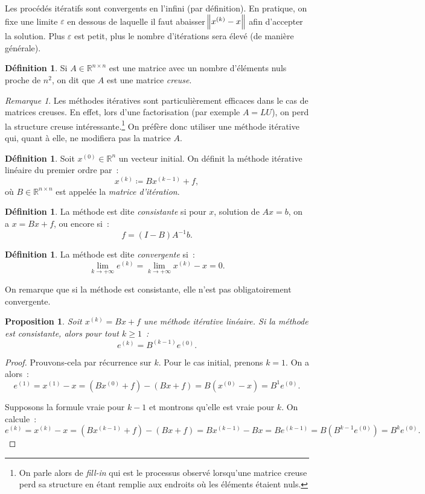 \documentclass{article}
\newtheorem{prp}[thm]{Proposition}
\theoremstyle{definition}
\newtheorem{déf}[thm]{Définition}
\theoremstyle{remark}
\newtheorem*{rmq}{Remarque}
\newcommand{\R}{\mathbb R}
\begin{document}
		Les procédés itératifs sont convergents en l'infini (par définition). En pratique, on fixe une limite $\varepsilon$ en dessous de laquelle il faut
		abaisser $\norm{x^{(k)}-x}$ afin d'accepter la solution. Plus $\varepsilon$ est petit, plus le nombre d'itérations sera élevé (de manière générale).

		\begin{déf} Si $A \in \R^{n \times n}$ est une matrice avec un nombre d'éléments nuls proche de $n^2$, on dit que $A$ est une matrice \emph{creuse}.
		\end{déf}

		\begin{rmq} Les méthodes itératives sont particulièrement efficaces dans le cas de matrices creuses. En effet, lors d'une factorisation (par exemple
		$A = LU$), on perd la structure creuse intéressante.\footnote{On parle alors de \emph{fill-in} qui est le processus observé lorsqu'une matrice creuse
		perd sa structure en étant remplie aux endroits où les éléments étaient nuls.} On préfère donc utiliser une méthode itérative qui, quant à elle, ne
		modifiera pas la matrice $A$.
		\end{rmq}

		\begin{déf} Soit $x^{(0)} \in \R^n$ un vecteur initial. On définit la méthode itérative linéaire du premier ordre par~:
		\[x^{(k)} \coloneqq Bx^{(k-1)} + f,\]
		où $B \in \R^{n \times n}$ est appelée la \emph{matrice d'itération}.
		\end{déf}

		\begin{déf} La méthode est dite \emph{consistante} si pour $x$, solution de $Ax=b$, on a $x = Bx + f$, ou encore si~:
		\[f = (I-B)A^{-1}b.\]
		\end{déf}

		\begin{déf} La méthode est dite \emph{convergente} si~:
		\[\lim_{k \to +\infty}e^{(k)} = \lim_{k \to +\infty}x^{(k)} - x = 0.\]
		\end{déf}

		On remarque que si la méthode est consistante, elle n'est pas obligatoirement convergente.

		\begin{prp} Soit $x^{(k)} = Bx + f$ une méthode itérative linéaire. Si la méthode est consistante, alors pour tout $k \geq 1$~:
		\[e^{(k)} = B^{(k-1)}e^{(0)}.\]
		\end{prp}

		\begin{proof} Prouvons-cela par récurrence sur $k$. Pour le cas initial, prenons $k=1$. On a alors~:
		\[e^{(1)} = x^{(1)}-x = (Bx^{(0)} + f) - (Bx + f) = B(x^{(0)}-x) = B^1e^{(0)}.\]

		Supposons la formule vraie pour $k-1$ et montrons qu'elle est vraie pour $k$. On calcule~:
		\[e^{(k)} = x^{(k)} - x = (Bx^{(k-1)} + f) - (Bx + f) = Bx^{(k-1)} - Bx = Be^{(k-1)} = B(B^{k-1}e^{(0)}) = B^ke^{(0)}.\]
		\end{proof}
\end{document}
